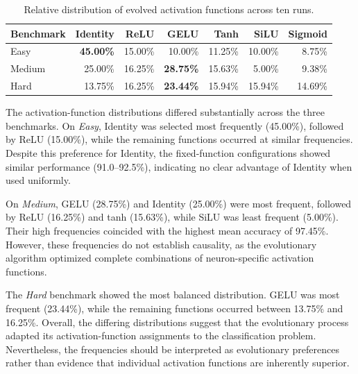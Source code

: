 \documentclass[12pt,fleqn,a4paper]{article}
\begin{document}
\begin{table}[ht]
    \centering
    \caption{Relative distribution of evolved activation functions across ten runs.}
    \label{tab:function_percentages}
    \renewcommand{\arraystretch}{1.2}
    \begin{tabular}{lrrrrrr}
        \toprule
        \textbf{Benchmark}
        & \textbf{Identity}
        & \textbf{ReLU}
        & \textbf{GELU}
        & \textbf{Tanh}
        & \textbf{SiLU}
        & \textbf{Sigmoid} \\
        \midrule
        Easy
        & \textbf{45.00\%} & 15.00\% & 10.00\% & 11.25\% & 10.00\% & 8.75\% \\

        Medium
        & 25.00\% & 16.25\% & \textbf{28.75\%} & 15.63\% & 5.00\% & 9.38\% \\

        Hard
        & 13.75\% & 16.25\% & \textbf{23.44\%} & 15.94\% & 15.94\% & 14.69\% \\
        \bottomrule
    \end{tabular}
\end{table}

The activation-function distributions differed substantially across the three benchmarks. On \textit{Easy}, Identity was selected most frequently (45.00\%), followed by ReLU (15.00\%), while the remaining functions occurred at similar frequencies. Despite this preference for Identity, the fixed-function configurations showed similar performance (91.0--92.5\%), indicating no clear advantage of Identity when used uniformly.

On \textit{Medium}, GELU (28.75\%) and Identity (25.00\%) were most frequent, followed by ReLU (16.25\%) and tanh (15.63\%), while SiLU was least frequent (5.00\%). Their high frequencies coincided with the highest mean accuracy of 97.45\%. However, these frequencies do not establish causality, as the evolutionary algorithm optimized complete combinations of neuron-specific activation functions.

The \textit{Hard} benchmark showed the most balanced distribution. GELU was most frequent (23.44\%), while the remaining functions occurred between 13.75\% and 16.25\%. Overall, the differing distributions suggest that the evolutionary process adapted its activation-function assignments to the classification problem. Nevertheless, the frequencies should be interpreted as evolutionary preferences rather than evidence that individual activation functions are inherently superior.
\newpage
\end{document}
